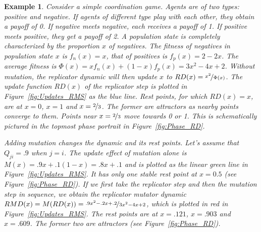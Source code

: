 \documentclass[a4paper, 11pt]{article}
\theoremstyle{Satz}
\newtheorem{example}{Example}
\begin{document}
\begin{example}
  Consider a simple coordination game. Agents are of two types: positive and negative. If
  agents of different type play with each other, they obtain a payoff of 0. If negative meets
  negative, each receives a payoff of 1. If positive meets positive, they get a payoff of 2. A
  population state is completely characterized by the proportion $x$ of negatives. The fitness
  of negatives in population state $x$ is $f_n(x) = x$, that of positives is $f_p(x) = 2-2x$.
  The average fitness is $\Phi(x) = x f_n(x) + (1-x) f_p(x) = 3x^2 - 4x + 2$. Without mutation,
  the replicator dynamic will then update $x$ to $RD(x) = \nicefrac{x^2}{\Phi(x)}$. The update
  function $RD(x)$ of the replicator step is plotted in Figure~\ref{fig:Updates_RMS} as the
  blue line. Rest points, for which $RD(x)=x$, are at $x=0$, $x=1$ and $x= \nicefrac{2}{3}$.
  The former are attractors as nearby points converge to them. Points near $x=\nicefrac{2}{3}$
  move towards 0 or 1. This is schematically pictured in the topmost phase portrait in
  Figure~\ref{fig:Phase_RD}.

  Adding mutation changes the dynamic and its rest points. Let's assume that $Q_{ji} = .9$
  when $j=i$. The update effect of mutation alone is $M(x) = .9 x + .1 (1-x) = .8x + .1$ and is
  plotted as the linear green line in Figure~\ref{fig:Updates_RMS}. It has only one stable rest
  point at $x = 0.5$ (see Figure~\ref{fig:Phase_RD}). If we first take the replicator step and
  then the mutation step in sequence, we obtain the replicator mutator dynamic
  $RMD(x) = M(RD(x)) = \nicefrac{.9x^2 - .2x +.2}{3x^2 - 4x + 2}$, which is plotted in red in
  Figure~\ref{fig:Updates_RMS}. The rest points are at $x=.121$, $x=.903$ and $x=.609$. The
  former two are attractors (see Figure~\ref{fig:Phase_RD}).
\end{example}
\end{document}
